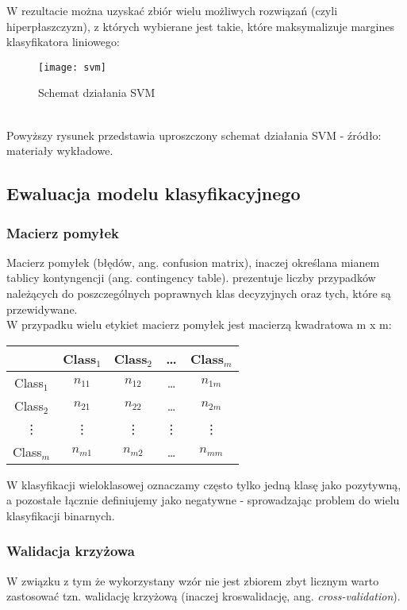 W rezultacie można uzyskać zbiór wielu możliwych rozwiązań (czyli hiperpłaszczyzn), z których wybierane jest takie, które maksymalizuje margines klasyfikatora liniowego:\\
\begin{figure}[h]
    \centering
    \texttt{[image: svm]}
    \caption{Schemat działania SVM}
    \label{fig:svm}
\end{figure}\\
Powyższy rysunek przedstawia uproszczony schemat działania SVM - źródło: materiały wykładowe.

\subsection{Ewaluacja modelu klasyfikacyjnego}
\subsubsection{Macierz pomyłek \cite{wyklad}}
Macierz pomyłek (błędów, ang. confusion matrix), inaczej określana mianem tablicy kontyngencji (ang. contingency table). prezentuje liczby przypadków należących do poszczególnych poprawnych klas decyzyjnych oraz tych, które są przewidywane.\\

W przypadku wielu etykiet macierz pomyłek jest macierzą kwadratowa m x m:\\


\begin{table}[h!]
    \centering
    \begin{tabular}{|c|c|c|c|c|}
    \hline
     & Class$_1$ & Class$_2$ & \ldots & Class$_m$ \\
    \hline
    Class$_1$ & $n_{11}$ & $n_{12}$ & \ldots & $n_{1m}$ \\
    \hline
    Class$_2$ & $n_{21}$ & $n_{22}$ & \ldots & $n_{2m}$ \\
    \hline
    \vdots & \vdots & \vdots & \vdots & \vdots \\
    \hline
    Class$_m$ & $n_{m1}$ & $n_{m2}$ & \ldots & $n_{mm}$ \\
    \hline
    \end{tabular}
    \end{table}
    
\noindent W klasyfikacji wieloklasowej oznaczamy często tylko jedną klasę jako pozytywną, a pozostałe łącznie definiujemy jako negatywne - sprowadzając problem do wielu klasyfikacji binarnych.

\subsubsection{Walidacja krzyżowa}
W związku z tym że wykorzystany wzór nie jest zbiorem zbyt licznym warto zastosować tzn. walidację krzyżową (inaczej kroswalidację, ang. \textit{cross-validation}).\\

